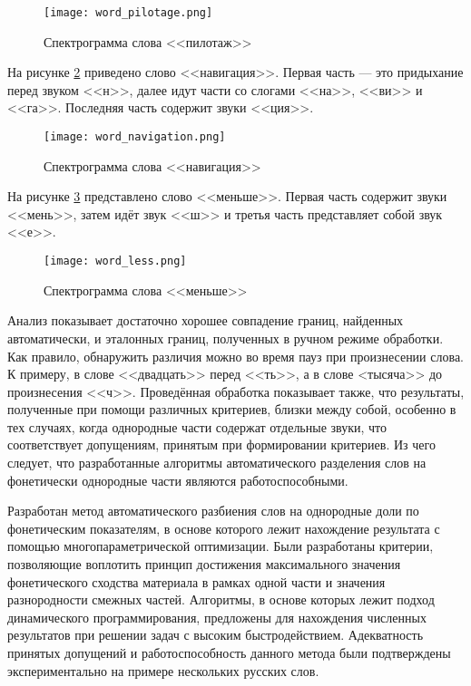 \begin{figure}[h]
	\centering
	\texttt{[image: word\_pilotage.png]}
	\caption{Спектрограмма слова <<пилотаж>>}
	\label{fig:word_pilotage}
\end{figure}

На рисунке \ref{fig:word_navigation} приведено слово <<навигация>>.
Первая часть --- это придыхание перед звуком <<н>>, далее идут части со слогами <<на>>, <<ви>> и <<га>>.
Последняя часть содержит звуки <<ция>>.

\begin{figure}[h]
	\centering
	\texttt{[image: word\_navigation.png]}
	\caption{Спектрограмма слова <<навигация>>}
	\label{fig:word_navigation}
\end{figure}

На рисунке \ref{fig:word_less} представлено слово <<меньше>>. Первая часть содержит звуки <<мень>>, затем идёт звук <<ш>> и третья часть представляет собой звук <<е>>.

\begin{figure}[h]
	\centering
	\texttt{[image: word\_less.png]}
	\caption{Спектрограмма слова <<меньше>>}
	\label{fig:word_less}
\end{figure}

Анализ показывает достаточно хорошее совпадение границ, найденных автоматически, и эталонных границ, полученных в ручном режиме обработки.
Как правило, обнаружить различия можно во время пауз при произнесении слова.
К примеру, в слове <<двадцать>> перед <<ть>>, а в слове <тысяча>> до произнесения <<ч>>.
Проведённая обработка показывает также, что результаты, полученные при помощи различных критериев, близки между собой, особенно в тех случаях, когда однородные части содержат отдельные звуки, что соответствует допущениям, принятым при формировании критериев.
Из чего следует, что разработанные алгоритмы автоматического разделения слов на фонетически однородные части являются работоспособными.

Разработан метод автоматического разбиения слов на однородные доли по фонетическим показателям, в основе которого лежит нахождение результата с помощью многопараметрической оптимизации.
Были разработаны критерии, позволяющие воплотить принцип достижения максимального значения фонетического сходства материала в рамках одной части и значения разнородности смежных частей.
Алгоритмы, в основе которых лежит подход динамического программирования, предложены для нахождения численных результатов при решении задач с высоким быстродействием.
Адекватность принятых допущений и работоспособность данного метода были подтверждены экспериментально на примере нескольких русских слов.

